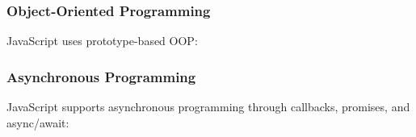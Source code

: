 \hypertarget{object-oriented-programming-1}{%
\subsubsection{Object-Oriented
Programming}\label{object-oriented-programming-1}}

JavaScript uses prototype-based OOP:

\begin{Shaded}
\begin{Highlighting}[]
         \OperatorTok{=}\OperatorTok{;}
\NormalTok{    \}}

    \NormalTok{() \{}
        \NormalTok{(}\VerbatimStringTok{\textasciigrave{}}\SpecialCharTok{$\{}\SpecialCharTok{\}}\NormalTok{)}\OperatorTok{;}
\NormalTok{    \}}
\NormalTok{\}}

    \NormalTok{() \{}
        \NormalTok{(}\VerbatimStringTok{\textasciigrave{}}\SpecialCharTok{$\{}\SpecialCharTok{\}}\NormalTok{)}\OperatorTok{;}
\NormalTok{    \}}
\NormalTok{\}}

\OperatorTok{=}  \NormalTok{(}\NormalTok{)}\OperatorTok{;}
\NormalTok{()}\OperatorTok{;}  
\end{Highlighting}
\end{Shaded}

\hypertarget{asynchronous-programming}{%
\subsubsection{Asynchronous
Programming}\label{asynchronous-programming}}

JavaScript supports asynchronous programming through callbacks,
promises, and async/await:

